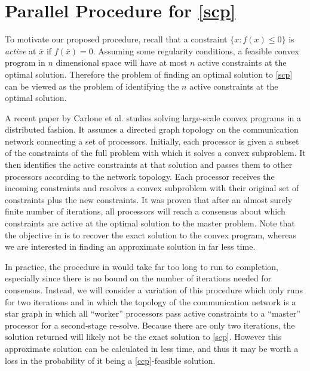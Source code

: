 \documentclass[12pt]{article}
\begin{document}
\section*{Parallel Procedure for \ref{scp}}
To motivate our proposed procedure, recall that a constraint $\{ x: f(x) \leq 0 \}$ is \emph{active} at $\bar{x}$ if $f(\bar{x}) = 0$. Assuming some regularity conditions, a feasible convex program in $n$ dimensional space will have at most $n$ active constraints at the optimal solution.
Therefore the problem of finding an optimal solution to \ref{scp} can be viewed as the problem of identifying the $n$ active constraints at the optimal solution.

A recent paper by Carlone et al. \cite{carlone2014} studies solving large-scale convex programs in a distributed fashion.
It assumes a directed graph topology on the communication network connecting a set of processors.
Initially, each processor is given a subset of the constraints of the full problem with which it solves a convex subproblem.
It then identifies the active constraints at that solution and passes them to other processors according to the network topology.
Each processor receives the incoming constraints and resolves a convex subproblem with their original set of constraints plus the new constraints.
It was proven that after an almost surely finite number of iterations, all processors will reach a consensus about which constraints are active at the optimal solution to the master problem.
Note that the objective in \cite{carlone2014} is to recover the exact solution to the convex program, whereas we are interested in finding an approximate solution in far less time.

In practice, the procedure in \cite{carlone2014} would take far too long to run to completion, especially since there is no bound on the number of iterations needed for consensus.
Instead, we will consider a variation of this procedure which only runs for two iterations and in which the topology of the communication network is a star graph in which all ``worker'' processors pass active constraints to a ``master'' processor for a second-stage re-solve.
Because there are only two iterations, the solution returned will likely not be the exact solution to \ref{scp}.
However this approximate solution can be calculated in less time, and thus it may be worth a loss in the probability of it being a \ref{ccp}-feasible solution.
\end{document}

